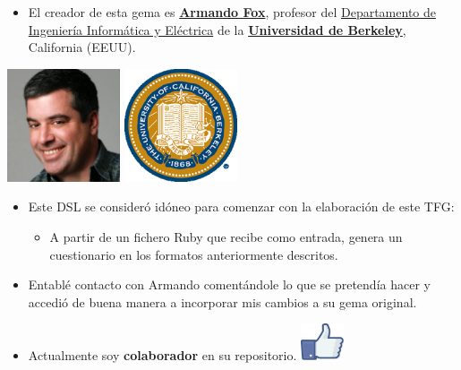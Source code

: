 \documentclass{beamer}
\begin{document}
\begin{frame}[allowframebreaks]
  \begin{itemize}
    \item El creador de esta gema es \href{http://www.armandofox.com/geek}{{\bfseries Armando Fox}}, profesor del 
    \href{http://www.cs.berkeley.edu/}{Departamento de Ingeniería Informática y Eléctrica} de la 
    \href{http://www.berkeley.edu/}{{\bfseries Universidad de Berkeley}}, California (EEUU).
  \end{itemize}
  \begin{center}
    \includegraphics[width=0.25\textwidth]{img/armando.eps}
    \hspace*{1.5cm}
    \includegraphics[width=0.25\textwidth]{img/Berkeley.eps}
  \end{center}
  \framebreak
  
  \begin{itemize}
    \item Este DSL se consideró idóneo para comenzar con la elaboración de este TFG:
    \begin{itemize}
      \item A partir de un fichero Ruby que recibe como entrada, genera un cuestionario en los formatos anteriormente descritos.
    \end{itemize}
    \item Entablé contacto con Armando comentándole lo que se pretendía hacer y
    accedió de buena manera a incorporar mis cambios a su gema original. 
    \item Actualmente soy {\bfseries colaborador} en su repositorio. \includegraphics[width=0.1\textwidth]{img/like.eps}
  \end{itemize}
  \framebreak
  

\end{frame}
\end{document}
